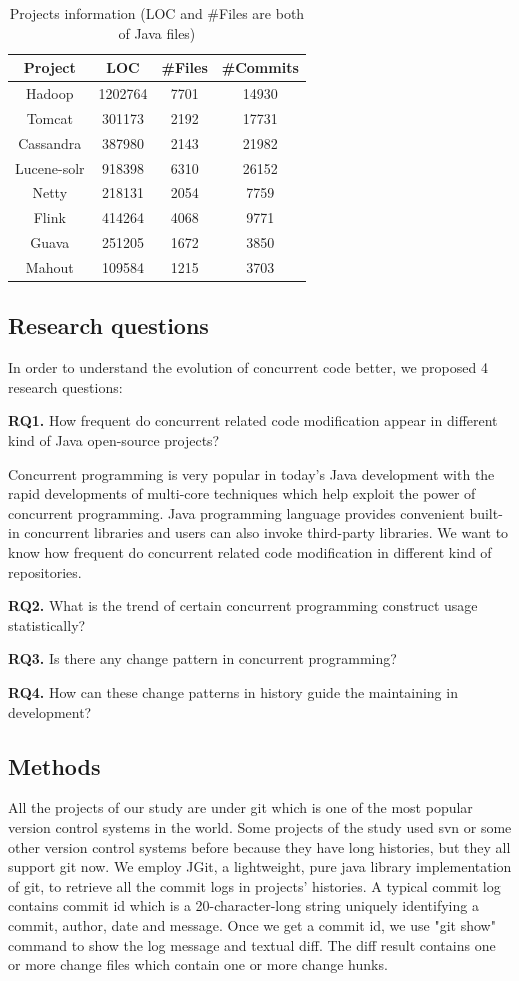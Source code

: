 \documentclass{sig-alternate-05-2015}
\begin{document}
\begin{table}
\centering
\caption{Projects information (LOC and \#Files are both of Java files)}
\begin{tabular}{|c|c|c|c|}\hline
Project&LOC&\#Files&\#Commits\\\hline
Hadoop&1202764&7701&14930\\\hline
Tomcat&301173&2192&17731\\\hline
Cassandra&387980&2143&21982\\\hline
Lucene-solr&918398&6310&26152\\\hline
Netty&218131&2054&7759\\\hline
Flink&414264&4068&9771\\\hline
Guava&251205&1672&3850\\\hline
Mahout&109584&1215&3703\\\hline
\end{tabular}
\end{table}

\subsection{Research questions}
In order to understand the evolution of concurrent code better, we proposed 4 research questions:

\textbf{RQ1.} How frequent do concurrent related code modification appear in different kind of Java open-source projects?

Concurrent programming is very popular in today's Java development with the rapid developments of multi-core techniques which help exploit the power of concurrent programming. Java programming language provides convenient built-in concurrent libraries and users can also invoke third-party libraries. We want to know how frequent do concurrent related code modification in different kind of repositories.

\textbf{RQ2.} What is the trend of certain concurrent programming construct usage statistically?

\textbf{RQ3.} Is there any change pattern in concurrent programming?

\textbf{RQ4.} How can these change patterns in history guide the maintaining in development?

\subsection{Methods}
All the projects of our study are under git which is one of the most popular version control systems in the world. Some projects of the study used svn or some other version control systems before because they have long histories, but they all support git now. We employ JGit, a  lightweight, pure java library implementation of git, to retrieve all the commit logs in projects' histories. A typical commit log contains commit id which is a 20-character-long string uniquely identifying a commit, author, date and message. Once we get a commit id, we use "git show" command to show the log message and textual diff. The diff result contains one or more change files which contain one or more change hunks.
\end{document}
